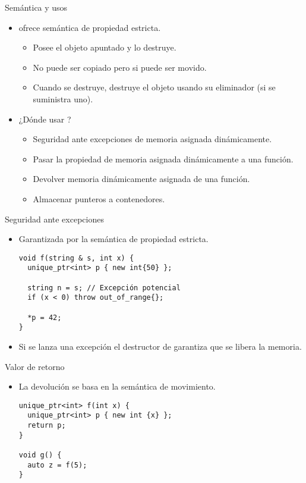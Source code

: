\begin{frame}{Semántica y usos}
\begin{itemize}
  \item {} ofrece semántica de propiedad estricta.
    \begin{itemize}
      \item Posee el objeto apuntado y lo destruye.
      \item No puede ser copiado pero si puede ser movido.
      \item Cuando se destruye, destruye el objeto usando su eliminador (si se suministra uno).
    \end{itemize}
  \item ¿Dónde usar ?
    \begin{itemize}
      \item Seguridad ante excepciones de memoria asignada dinámicamente.
      \item Pasar la propiedad de memoria asignada dinámicamente a una función.
      \item Devolver memoria dinámicamente asignada de una función.
      \item Almacenar punteros a contenedores.
    \end{itemize}
\end{itemize}
\end{frame}

\begin{frame}[fragile]{Seguridad ante excepciones}
\begin{itemize}
  \item Garantizada por la semántica de propiedad estricta.
\begin{lstlisting}
void f(string & s, int x) {
  unique_ptr<int> p { new int{50} };

  string n = s; // Excepción potencial
  if (x < 0) throw out_of_range{};

  *p = 42;
}
\end{lstlisting}
  \item Si se lanza una excepción el destructor de  garantiza
  que se libera la memoria.
\end{itemize}
\end{frame}

\begin{frame}[fragile]{Valor de retorno}
\begin{itemize}
  \item La devolución se basa en la semántica de movimiento.
\begin{lstlisting}
unique_ptr<int> f(int x) {
  unique_ptr<int> p { new int {x} };
  return p;
}

void g() {
  auto z = f(5);
}
\end{lstlisting}
\end{itemize}
\end{frame}



